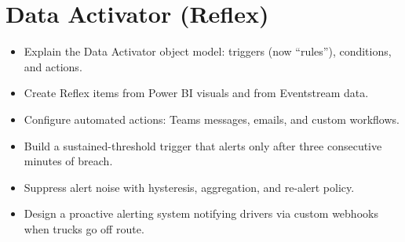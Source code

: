 \chapter{Data Activator (Reflex)}
%

\begin{objectives}
\begin{itemize}
    \item Explain the Data Activator object model: triggers (now ``rules''), conditions, and actions.
    \item Create Reflex items from Power BI visuals and from Eventstream data.
    \item Configure automated actions: Teams messages, emails, and custom workflows.
    \item Build a sustained-threshold trigger that alerts only after three consecutive minutes of breach.
    \item Suppress alert noise with hysteresis, aggregation, and re-alert policy.
    \item Design a proactive alerting system notifying drivers via custom webhooks when trucks go off route.
\end{itemize}
\end{objectives}

